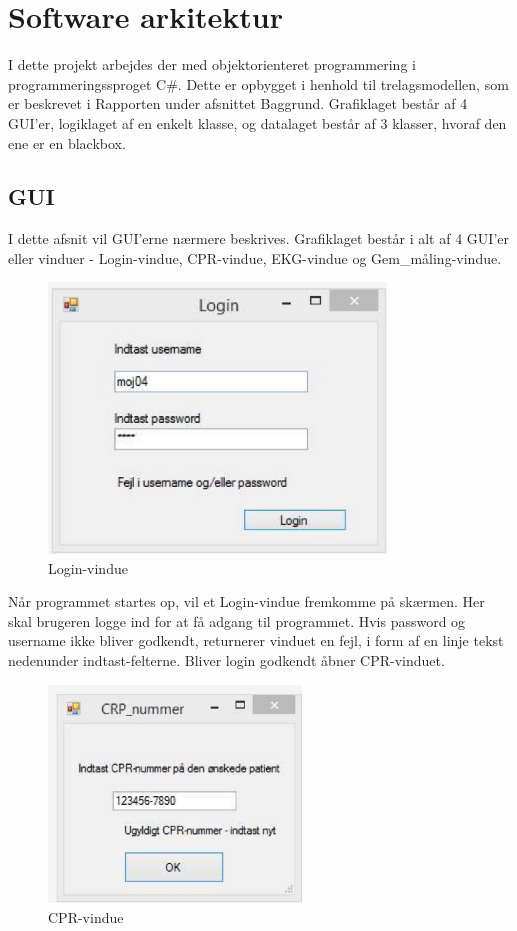 \section{Software arkitektur}
I dette projekt arbejdes der med objektorienteret programmering i programmeringssproget C\#. Dette er opbygget i henhold til trelagsmodellen, som er beskrevet i Rapporten under afsnittet Baggrund. Grafiklaget består af 4 GUI’er, logiklaget af en enkelt klasse, og datalaget består af 3 klasser, hvoraf den ene er en blackbox.

\subsection{GUI}
I dette afsnit vil GUI’erne nærmere beskrives. Grafiklaget består i alt af 4 GUI’er eller vinduer - Login-vindue, CPR-vindue, EKG-vindue og Gem\_måling-vindue.

\begin{figure}[H]
	\centering
	\includegraphics[width=0.8\textwidth]{Figurer/Snip20150430_38}
	\caption{Login-vindue}
\end{figure}

Når programmet startes op, vil et Login-vindue fremkomme på skærmen. Her skal brugeren logge ind for at få adgang til programmet. Hvis password og username ikke bliver godkendt, returnerer vinduet en fejl, i form af en linje tekst nedenunder indtast-felterne. Bliver login godkendt åbner CPR-vinduet.

\begin{figure}[H]
	\centering
	\includegraphics[width=0.6\textwidth]{Figurer/Snip20150430_39}
	\caption{CPR-vindue}
\end{figure} 

